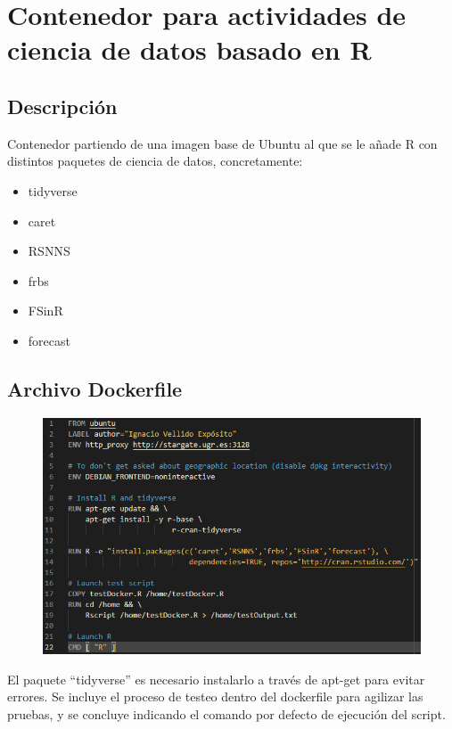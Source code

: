 \section{Contenedor para actividades de ciencia de datos basado en R}

\subsection{Descripción}

Contenedor partiendo de una imagen base de Ubuntu al que se le añade R con distintos paquetes de ciencia de datos, concretamente:
\begin{itemize}
    \item tidyverse
    \item caret
    \item RSNNS
    \item frbs 
    \item FSinR 
    \item forecast
\end{itemize}

\subsection{Archivo Dockerfile}

\begin{figure}[H]\center\includegraphics[width=.95\linewidth]{img/r/r0.png}\caption{}\end{figure}

El paquete ``tidyverse'' es necesario instalarlo a través de apt-get para evitar errores. 
Se incluye el proceso de testeo dentro del dockerfile para agilizar las pruebas, y se concluye indicando el comando por defecto de ejecución del script.

